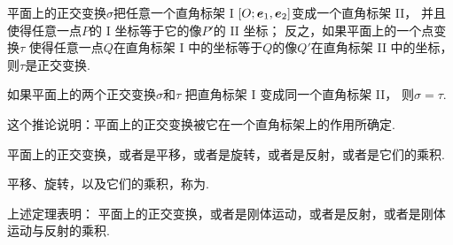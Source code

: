 \begin{theorem}
平面上的正交变换\(\sigma\)把任意一个直角标架 I \([O;\boldsymbol{e}_1,\boldsymbol{e}_2]\)变成一个直角标架 II，
并且使得任意一点\(P\)的 I 坐标等于它的像\(P'\)的 II 坐标；
反之，如果平面上的一个点变换\(\tau\)
使得任意一点\(Q\)在直角标架 I 中的坐标等于\(Q\)的像\(Q'\)在直角标架 II 中的坐标，
则\(\tau\)是正交变换.
\end{theorem}

\begin{corollary}
如果平面上的两个正交变换\(\sigma\)和\(\tau\)
把直角标架 I 变成同一个直角标架 II，
则\(\sigma = \tau\).
\end{corollary}
\begin{remark}
这个推论说明：平面上的正交变换被它在一个直角标架上的作用所确定.
\end{remark}

\begin{theorem}
平面上的正交变换，或者是平移，或者是旋转，或者是反射，或者是它们的乘积.
\end{theorem}

平移、旋转，以及它们的乘积，称为.

上述定理表明：
平面上的正交变换，或者是刚体运动，或者是反射，或者是刚体运动与反射的乘积.

